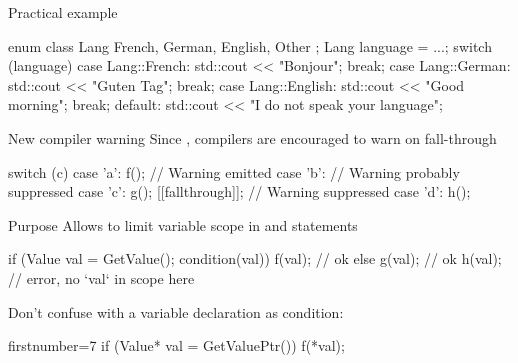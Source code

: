 \begin{frame}[fragile]
  \begin{exampleblock}{Practical example}
    \begin{cppcode*}{}
      enum class Lang { French, German, English, Other };
      Lang language = ...;
      switch (language) {
        case Lang::French:
          std::cout << "Bonjour";
          break;
        case Lang::German:
          std::cout << "Guten Tag";
          break;
        case Lang::English:
          std::cout << "Good morning";
          break;
        default:
          std::cout << "I do not speak your language";
      }
    \end{cppcode*}
  \end{exampleblock}
\end{frame}


\begin{frame}[fragile]
  \begin{block}{New compiler warning}
    Since , compilers are encouraged to warn on fall-through
  \end{block}
  \begin{exampleblock}{}
    \begin{cppcode*}{}
      switch (c) {
        case 'a':
          f();    // Warning emitted
        case 'b': // Warning probably suppressed
        case 'c':
          g();
          [[fallthrough]]; // Warning suppressed
        case 'd':
          h();
      }
    \end{cppcode*}
  \end{exampleblock}
\end{frame}

\begin{frame}[fragile]
  \begin{block}{Purpose}
    Allows to limit variable scope in  and  statements
  \end{block}
  \begin{exampleblock}{}
    \begin{cppcode*}{}
      if (Value val = GetValue(); condition(val)) {
        f(val); // ok
      } else
        g(val); // ok
      h(val);   // error, no `val` in scope here
    \end{cppcode*}
  \end{exampleblock}
  \pause
  \begin{alertblock}{}
    Don't confuse with a variable declaration as condition:
    \begin{cppcode*}{firstnumber=7}
      if (Value* val = GetValuePtr())
        f(*val);
    \end{cppcode*}
  \end{alertblock}
\end{frame}

